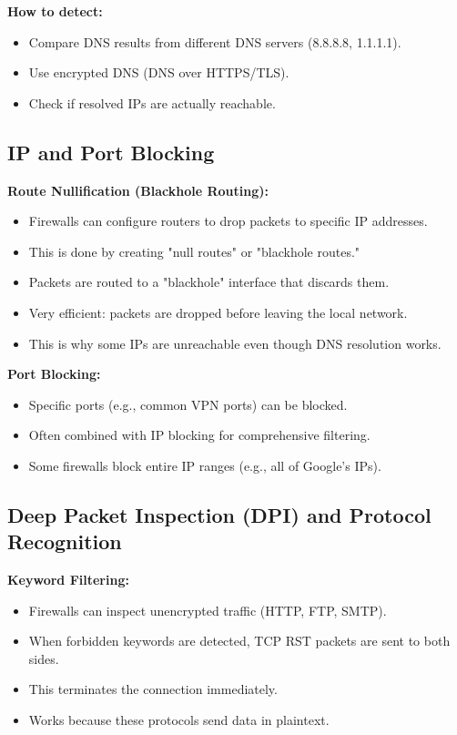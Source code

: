 \textbf{How to detect:}
\begin{itemize}
    \item Compare DNS results from different DNS servers (8.8.8.8, 1.1.1.1).
    \item Use encrypted DNS (DNS over HTTPS/TLS).
    \item Check if resolved IPs are actually reachable.
\end{itemize}

\subsection{IP and Port Blocking}

\textbf{Route Nullification (Blackhole Routing):}
\begin{itemize}
    \item Firewalls can configure routers to drop packets to specific IP addresses.
    \item This is done by creating "null routes" or "blackhole routes."
    \item Packets are routed to a "blackhole" interface that discards them.
    \item Very efficient: packets are dropped before leaving the local network.
    \item This is why some IPs are unreachable even though DNS resolution works.
\end{itemize}

\textbf{Port Blocking:}
\begin{itemize}
    \item Specific ports (e.g., common VPN ports) can be blocked.
    \item Often combined with IP blocking for comprehensive filtering.
    \item Some firewalls block entire IP ranges (e.g., all of Google's IPs).
\end{itemize}

\subsection{Deep Packet Inspection (DPI) and Protocol Recognition}

\textbf{Keyword Filtering:}
\begin{itemize}
    \item Firewalls can inspect unencrypted traffic (HTTP, FTP, SMTP).
    \item When forbidden keywords are detected, TCP RST packets are sent to both sides.
    \item This terminates the connection immediately.
    \item Works because these protocols send data in plaintext.
\end{itemize}

